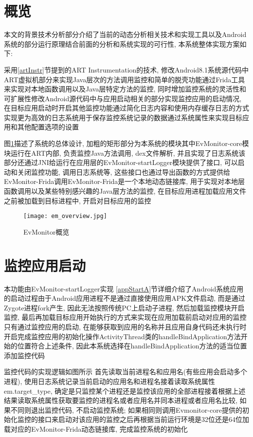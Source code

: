 \section{概览}
本文的背景技术分析部分介绍了当前的动态分析相关技术和实现工具以及Android系统的部分运行原理\juhao 结合前面的分析和系统实现的可行性, 本系统整体实现方案如下:

采用\ref{artInstr}节提到的ART Instrumentation的技术, 修改Android8.1系统源代码中ART虚拟机部分来实现Java层次的方法调用监控和简单的脱壳功能\juhao 通过Frida工具来实现对本地函数调用以及Java层特定方法的监控, 同时增加监控系统的灵活性和可扩展性\juhao 修改Android源代码中与应用启动相关的部分实现监控应用的启动情况, 在目标应用启动时开启其他监控功能\juhao 通过简化日志内容和使用内存缓存日志的方式实现更为高效的日志系统用于保存监控系统记录的数据\juhao 通过系统属性来实现目标应用和其他配置选项的设置\juhao 

图\ref{emOverview}描述了系统的总体设计, 加粗的矩形部分为本系统的模块\juhao 其中EvMonitor-core模块运行在ART内部, 负责监控Java方法调用, dex文件解析, 并且实现了日志系统\juhao 该部分还通过JNI给运行在应用层的EvMonitor-startLogger模块提供了接口, 可以启动和关闭监控功能, 调用日志系统等, 这些接口也通过导出函数的方式提供给EvMonitor-Frida调用\juhao EvMonitor-Frida是一个本地动态链接库, 用于实现对本地层函数调用以及某些特别感兴趣的Java层方法的监控, 在目标应用进程加载应用文件之前被加载到目标进程中, 开启对目标应用的监控\juhao 
\begin{figure}[ht]
	\centering
	\texttt{[image: em\_overview.jpg]}
	\caption{EvMonitor概览}
	\label{emOverview}
\end{figure}

\section{监控应用启动}
本功能由EvMonitor-startLogger实现\juhao 
\ref{appStartA}节详细介绍了Android系统应用的启动过程\juhao 由于Android应用进程不是通过直接使用应用APK文件启动, 而是通过Zygote进程fork产生, 因此无法按照传统PC上启动子进程, 然后加载监控模块开启监控, 最后再加载目标应用开始执行的方式来实现在应用加载前启动对应用的监控\juhao 只有通过监控应用的启动, 在能够获取到应用的名称并且应用自身代码还未执行时开启完成监控应用的初始化操作\juhao ActivityThread类的handleBindApplication方法开始的位置符合上述条件, 因此本系统选择在handleBindApplication方法的适当位置添加监控代码\juhao 

监控代码的实现逻辑如图所示\juhao
首先读取当前进程名和应用名(有些应用会启动多个进程), 使用日志系统记录当前启动的应用名和进程名\juhao 接着读取系统属性em.target\_type, 确定是只监控某个进程还是监控该应用的全部进程\juhao 接着根据上述结果读取系统属性获取要监控的进程名或者应用名并同本进程或者应用名比较, 如果不同则退出监控代码, 不启动监控系统; 如果相同则调用Evmonitor-core提供的初始化监控的接口来启动对该应用的监控\juhao 之后再根据当前运行环境是32位还是64位加载对应的EvMonitor-Frida动态链接库, 完成监控系统的初始化\juhao 


